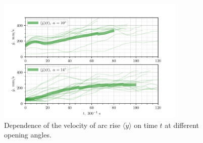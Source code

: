 \begin{figure}[htbp]
	\centering
	\includegraphics[width=0.8\textwidth]{figures/4,5)_dot_y_[10,14].pdf}
	\caption{Dependence of the velocity of arc rise $\langle \dot{y}\rangle$ on time $t$ at different opening angles.}
	\label{fig:label}
\end{figure}